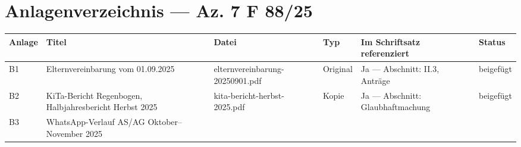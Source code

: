 \documentclass[
  11pt,
  a4paper,
]{article}
\newcounter{none}
\begin{document}

\section{Anlagenverzeichnis --- Az. 7 F
88/25}\label{anlagenverzeichnis-az.-7-f-8825}

{\def\LTcaptype{none} %
\begin{longtable}[]{@{}
  >{\raggedright\arraybackslash}p{}
  >{\raggedright\arraybackslash}p{}
  >{\raggedright\arraybackslash}p{}
  >{\raggedright\arraybackslash}p{}
  >{\raggedright\arraybackslash}p{}
  >{\raggedright\arraybackslash}p{}@{}}
\toprule\noalign{}
\begin{minipage}[b]{\linewidth}\raggedright
Anlage
\end{minipage} & \begin{minipage}[b]{\linewidth}\raggedright
Titel
\end{minipage} & \begin{minipage}[b]{\linewidth}\raggedright
Datei
\end{minipage} & \begin{minipage}[b]{\linewidth}\raggedright
Typ
\end{minipage} & \begin{minipage}[b]{\linewidth}\raggedright
Im Schriftsatz referenziert
\end{minipage} & \begin{minipage}[b]{\linewidth}\raggedright
Status
\end{minipage} \\
\midrule\noalign{}
\endhead
\bottomrule\noalign{}
\endlastfoot
B1 & Elternvereinbarung vom 01.09.2025 & elternvereinbarung-20250901.pdf
& Original & Ja --- Abschnitt: II.3, Anträge & beigefügt \\
B2 & KiTa-Bericht Regenbogen, Halbjahresbericht Herbst 2025 &
kita-bericht-herbst-2025.pdf & Kopie & Ja --- Abschnitt:
Glaubhaftmachung & beigefügt \\
B3 & WhatsApp-Verlauf AS/AG Oktober--November 2025 &

\end{longtable}}
\end{document}
